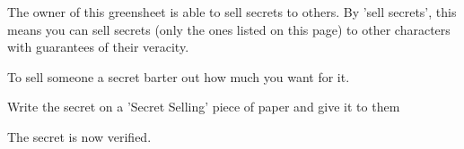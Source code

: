 \documentclass[green]{guildcamp3}
\begin{document}
\name{\gSecrets{}}


The owner of this greensheet is able to sell secrets to others. By 'sell secrets', this means you can sell secrets (only the ones listed on this page) to other characters with guarantees of their veracity. 

\begin{enum}[Directions]
  \item To sell someone a secret barter out how much you want for it.
  \item Write the secret on a 'Secret Selling' piece of paper and give it to them 
  \item The secret is now verified. 
\end{enum}
\end{document}
